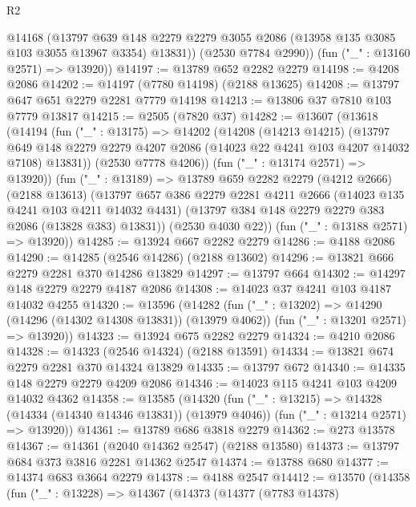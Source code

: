 \begin{lexlean}{R2}
\begin{coremodule}
          @14168
          (@13797
            @639
            @148
            @2279
            @2279
            @3055
            @2086
            (@13958 @135 @3085 @103 @3055 @13967 @3354)
            @13831))
        (@2530 @7784 @2990))
      (fun ("_" : @13160 @2571) => @13920))
@14197 := @13789 @652 @2282 @2279
@14198 := @4208 @2086
@14202 := @14197 (@7780 @14198) (@2188 @13625)
@14208 := @13797 @647 @651 @2279 @2281 @7779 @14198
@14213 := @13806 @37 @7810 @103 @7779 @13817
@14215 := @2505 (@7820 @37)
@14282 := @13607
    (@13618
      (@14194
        (fun ("_" : @13175) =>
        @14202
          (@14208
            (@14213 @14215)
            (@13797
              @649
              @148
              @2279
              @2279
              @4207
              @2086
              (@14023 @22 @4241 @103 @4207 @14032 @7108)
              @13831))
          (@2530 @7778 @4206))
        (fun ("_" : @13174 @2571) => @13920))
      (fun ("_" : @13189) =>
      @13789
        @659
        @2282
        @2279
        (@4212 @2666)
        (@2188 @13613)
        (@13797
          @657
          @386
          @2279
          @2281
          @4211
          @2666
          (@14023 @135 @4241 @103 @4211 @14032 @4431)
          (@13797 @384 @148 @2279 @2279 @383 @2086 (@13828 @383) @13831))
        (@2530 @4030 @22))
      (fun ("_" : @13188 @2571) => @13920))
@14285 := @13924 @667 @2282 @2279
@14286 := @4188 @2086
@14290 := @14285 (@2546 @14286) (@2188 @13602)
@14296 := @13821 @666 @2279 @2281 @370 @14286 @13829
@14297 := @13797 @664
@14302 := @14297 @148 @2279 @2279 @4187 @2086
@14308 := @14023 @37 @4241 @103 @4187 @14032 @4255
@14320 := @13596
    (@14282
      (fun ("_" : @13202) => @14290 (@14296 (@14302 @14308 @13831)) (@13979 @4062))
      (fun ("_" : @13201 @2571) => @13920))
@14323 := @13924 @675 @2282 @2279
@14324 := @4210 @2086
@14328 := @14323 (@2546 @14324) (@2188 @13591)
@14334 := @13821 @674 @2279 @2281 @370 @14324 @13829
@14335 := @13797 @672
@14340 := @14335 @148 @2279 @2279 @4209 @2086
@14346 := @14023 @115 @4241 @103 @4209 @14032 @4362
@14358 := @13585
    (@14320
      (fun ("_" : @13215) => @14328 (@14334 (@14340 @14346 @13831)) (@13979 @4046))
      (fun ("_" : @13214 @2571) => @13920))
@14361 := @13789 @686 @3818 @2279
@14362 := @273 @13578
@14367 := @14361 (@2040 @14362 @2547) (@2188 @13580)
@14373 := @13797 @684 @373 @3816 @2281 @14362 @2547
@14374 := @13788 @680
@14377 := @14374 @683 @3664 @2279
@14378 := @4188 @2547
@14412 := @13570
    (@14358
      (fun ("_" : @13228) =>
      @14367
        (@14373
          (@14377
            (@7783 @14378)

\end{coremodule}
\end{lexlean}
